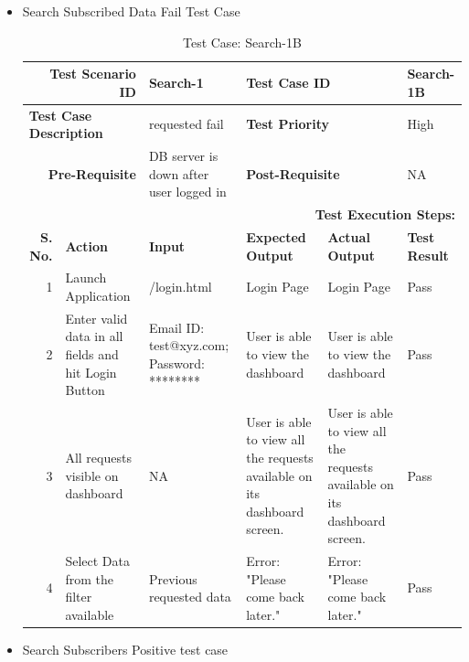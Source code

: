 \documentclass[a4paper, hidelinks, 12pt]{report}
\begin{document}
\begin{itemize}
\item{Search Subscribed Data Fail Test Case}
\begin{table}[H]
  \centering
  \caption{Test Case: Search-1B}
    \begin{tabular}{|r|p{4.355em}|p{7.715em}|p{6.43em}|p{5.855em}|p{5.07em}|}
    \toprule
    \multicolumn{2}{|p{13.425em}|}{\textbf{Test Scenario ID}} & Search-1 & \multicolumn{2}{p{12.285em}|}{\textbf{Test Case ID}} & Search-1B \\
    \midrule
    \multicolumn{2}{|l|}{\multirow{2}[2]{*}{\textbf{Test Case Description}}} & \multirow{2}[2]{*}{requested fail} & \multicolumn{2}{l|}{\multirow{2}[2]{*}{\textbf{Test Priority}}} & \multirow{2}[2]{*}{High} \\
    \multicolumn{2}{|l|}{} & \multicolumn{1}{l|}{} & \multicolumn{2}{l|}{} & \multicolumn{1}{l|}{} \\
    \midrule
    \multicolumn{2}{|p{13.425em}|}{\textbf{Pre-Requisite}} & DB server is down after user logged in & \multicolumn{2}{p{12.285em}|}{\textbf{Post-Requisite}} & NA \\
    \midrule
    \multicolumn{6}{p{38.495em}|}{\textbf{Test Execution Steps:}} \\
    \midrule
    \multicolumn{1}{|p{5.07em}|}{\textbf{S. No.}} & \textbf{Action } & \textbf{Input} & \textbf{Expected Output} & \textbf{Actual Output} & \textbf{Test Result} \\
    \midrule
    1     & Launch Application & /login.html & Login Page & Login Page & Pass \\
    \midrule
    2     & Enter valid data in all fields and hit Login Button & Email ID: test@xyz.com; Password: ******** & User is able to view the dashboard & User is able to view the dashboard & Pass \\
    \midrule
    3     & All requests visible on dashboard & NA    & User is able to view all the requests available on its dashboard screen. & User is able to view all the requests available on its dashboard screen. & Pass \\
    \midrule
    4     & Select Data from the filter available & Previous requested data & Error: "Please come back later." & Error: "Please come back later." & Pass \\
    \bottomrule
    \end{tabular}%
  \label{tab:Test Case: Search-1B}%
\end{table}%
\item{Search Subscribers Positive test case}

\end{itemize}
\end{document}
